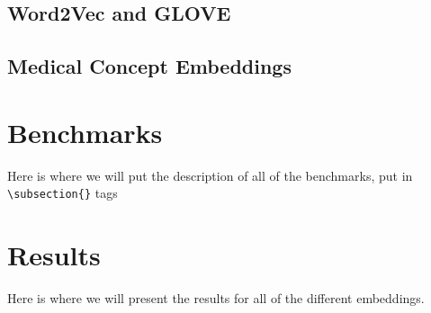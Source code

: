 \documentclass{ws-procs11x85}
\begin{document}
 \subsection{Word2Vec and GLOVE}

 \subsection{Medical Concept Embeddings}

\section{Benchmarks}
Here is where we will put the description of all of the benchmarks, put in \verb|\subsection{}| tags

\section{Results}
Here is where we will present the results for all of the different embeddings.




\end{document}

